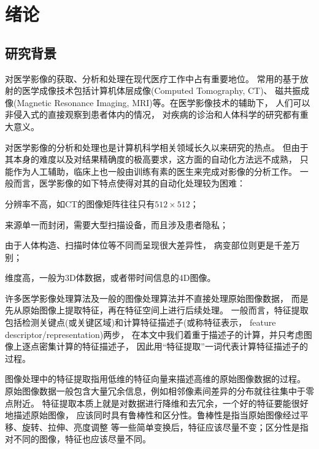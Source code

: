 
\chapter{绪论\label{chap:intro}}

\section{研究背景}
对医学影像的获取、分析和处理在现代医疗工作中占有重要地位。
常用的基于放射的医学成像技术包括计算机体层成像(Computed Tomography, CT)、
磁共振成像(Magnetic Resonance Imaging, MRI)等。在医学影像技术的辅助下，
人们可以非侵入式的直接观察到患者体内的情况，
对疾病的诊治和人体科学的研究都有重大意义。

对医学影像的分析和处理也是计算机科学相关领域长久以来研究的热点。
但由于其本身的难度以及对结果精确度的极高要求，这方面的自动化方法远不成熟，
只能作为人工辅助，临床上也一般由训练有素的医生来完成对影像的分析工作。
一般而言，医学影像的如下特点使得对其的自动化处理较为困难：
\begin{inparaenum}[\itshape 1\upshape)]
    \item 分辨率不高，如CT的图像矩阵往往只有$512\times 512$\cite{medimging2}；
    \item 来源单一而封闭，需要大型扫描设备，而且涉及患者隐私；
    \item 由于人体构造、扫描时体位等不同而呈现很大差异性，
        病变部位则更是千差万别；
    \item 维度高，一般为3D体数据，或者带时间信息的4D图像。
\end{inparaenum}

许多医学影像处理算法及一般的图像处理算法并不直接处理原始图像数据，
而是先从原始图像上提取特征，再在特征空间上进行后续处理。
一般而言，特征提取包括检测关键点(或关键区域)和计算特征描述子(或称特征表示，
feature descriptor/representation)两步，
在本文中我们着重于描述子的计算，并只考虑图像上逐点密集计算的特征描述子，
因此用``特征提取''一词代表计算特征描述子的过程。

图像处理中的特征提取指用低维的特征向量来描述高维的原始图像数据的过程。
原始图像数据一般包含大量冗余信息，例如相邻像素间差异的分布就往往集中于零点附近。
特征提取本质上就是对数据进行降维和去冗余，一个好的特征要能很好地描述原始图像，
应该同时具有鲁棒性和区分性。鲁棒性是指当原始图像经过平移、旋转、拉伸、亮度调整
等一些简单变换后，特征应该尽量不变；区分性是指对不同的图像，特征也应该尽量不同。

